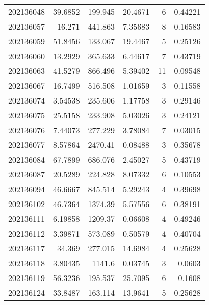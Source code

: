 \begin{tabular}{rrrrrr}
 202136048 &         39.6852  &      199.945  &           20.4671  &           6 & 0.44221 \\
 202136057 &         16.271   &      441.863  &            7.35683 &           8 & 0.16583 \\
 202136059 &         51.8456  &      133.067  &           19.4467  &           5 & 0.25126 \\
 202136060 &         13.2929  &      365.633  &            6.44617 &           7 & 0.43719 \\
 202136063 &         41.5279  &      866.496  &            5.39402 &          11 & 0.09548 \\
 202136067 &         16.7499  &      516.508  &            1.01659 &           3 & 0.11558 \\
 202136074 &          3.54538 &      235.606  &            1.17758 &           3 & 0.29146 \\
 202136075 &         25.5158  &      233.908  &            5.03026 &           3 & 0.24121 \\
 202136076 &          7.44073 &      277.229  &            3.78084 &           7 & 0.03015 \\
 202136077 &          8.57864 &     2470.41   &            0.08488 &           3 & 0.35678 \\
 202136084 &         67.7899  &      686.076  &            2.45027 &           5 & 0.43719 \\
 202136087 &         20.5289  &      224.828  &            8.07332 &           6 & 0.10553 \\
 202136094 &         46.6667  &      845.514  &            5.29243 &           4 & 0.39698 \\
 202136102 &         46.7364  &     1374.39   &            5.57556 &           6 & 0.38191 \\
 202136111 &          6.19858 &     1209.37   &            0.06608 &           4 & 0.49246 \\
 202136112 &          3.39871 &      573.089  &            0.50579 &           4 & 0.40704 \\
 202136117 &         34.369   &      277.015  &           14.6984  &           4 & 0.25628 \\
 202136118 &          3.80435 &     1141.6    &            0.03745 &           3 & 0.0603  \\
 202136119 &         56.3236  &      195.537  &           25.7095  &           6 & 0.1608  \\
 202136124 &         33.8487  &      163.114  &           13.9641  &           5 & 0.25628 \\

\end{tabular}
